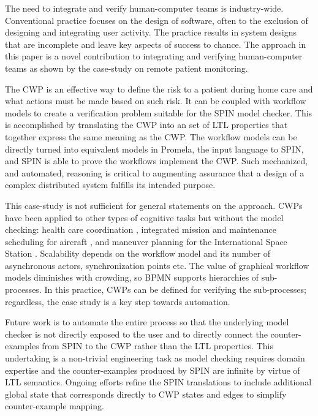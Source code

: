The need to integrate and verify human-computer teams is industry-wide. Conventional practice focuses on the design of software, often to the exclusion of designing and integrating user activity. The practice results in system designs that are incomplete and leave key aspects of success to chance. The approach in this paper is a novel contribution to integrating and verifying human-computer teams as shown by the case-study on remote patient monitoring. 

The CWP is an effective way to define the risk to a patient during home care and what actions must be made based on such risk. It can be coupled with workflow models to create a verification problem suitable for the SPIN model checker. This is accomplished by translating the CWP into an set of LTL properties that together express the same meaning as the CWP. The workflow models can be directly turned into equivalent models in Promela, the input language to SPIN, and SPIN is able to prove the workflows implement the CWP. Such mechanized, and automated, reasoning is critical to augmenting assurance that a design of a complex distributed system fulfills its intended purpose. 

This case-study is not sufficient for general statements on the approach. CWPs have been applied to other types of cognitive tasks but without the model checking: health care coordination \cite{BERRY201615}, integrated mission and maintenance scheduling for aircraft \cite{workcentered}, and maneuver planning for the International Space Station \cite{10.1145/1978942.1979311}. Scalability depends on the workflow model and its number of asynchronous actors, synchronization points etc. The value of graphical workflow models diminishes with crowding, so BPMN supports hierarchies of sub-processes. In this practice, CWPs can be defined for verifying the sub-processes; regardless, the case study is a key step towards automation. 

Future work is to automate the entire process so that the underlying model checker is not directly exposed to the user and to directly connect the counter-examples from SPIN to the CWP rather than the LTL properties. This undertaking is a non-trivial engineering task as model checking requires domain expertise and the counter-examples produced by SPIN are infinite by virtue of LTL semantics. Ongoing efforts refine the SPIN translations to include additional global state that corresponds directly to CWP states and edges to simplify counter-example mapping.
